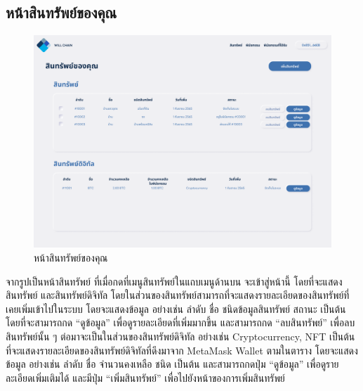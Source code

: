 \documentclass[12pt,oneside,openright,a4paper]{cpe-thai-project}
\begin{document}
\subsection{หน้าสินทรัพย์ของคุณ}
		\begin{figure}[!thb]
			\centering
			\includegraphics[scale=0.2]{userAsset}
			\caption{หน้าสินทรัพย์ของคุณ}
		\end{figure}
		\FloatBarrier
		\tab จากรูปเป็นหน้าสินทรัพย์ ที่เมื่อกดที่เมนูสินทรัพย์ในแถบเมนูด้านบน จะเข้าสู่หน้านี้ โดยที่จะแสดงสินทรัพย์ และสินทรัพย์ดิจิทัล โดยในส่วนของสินทรัพย์สามารถที่จะแสดงรายละเอียดของสินทรัพย์ที่เคยเพิ่มเข้าไปในระบบ โดยจะแสดงข้อมูล อย่างเช่น ลำดับ ชื่อ ชนิดข้อมูลสินทรัพย์ สถานะ เป็นต้น โดยที่จะสามารถกด “ดูข้อมูล” เพื่อดูรายละเอียดที่เพิ่มมากขึ้น และสามารถกด “ลบสินทรัพย์” เพื่อลบสินทรัพย์นั้น ๆ 
ต่อมาจะเป็นในส่วนของสินทรัพย์ดิจิทัล อย่างเช่น Cryptocurrency, NFT เป็นต้น ที่จะแสดงรายละเอียดของสินทรัพย์ดิจิทัลที่ดึงมาจาก MetaMask Wallet ตามในตาราง โดยจะแสดงข้อมูล อย่างเช่น ลำดับ ชื่อ จำนวนคงเหลือ ชนิด เป็นต้น และสามารถกดปุ่ม “ดูข้อมูล” เพื่อดูรายละเอียดเพิ่มเติมได้
และมีปุ่ม “เพิ่มสินทรัพย์” เพื่อไปยังหน้าของการเพิ่มสินทรัพย์
\clearpage
\end{document}
